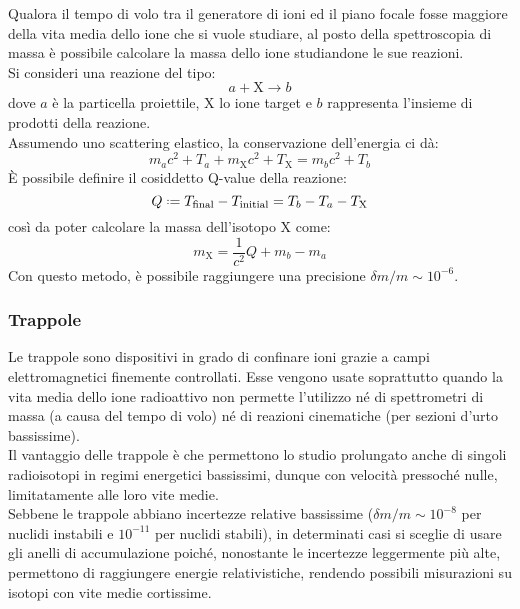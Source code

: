 Qualora il tempo di volo tra il generatore di ioni ed il piano focale fosse maggiore della vita media dello ione che si vuole studiare, al posto della spettroscopia di massa è possibile calcolare la massa dello ione studiandone le sue reazioni.\\
Si consideri una reazione del tipo:
\begin{equation}
	a + \text{X} \longrightarrow b
	\label{eq:1.19}
\end{equation}
dove $ a $ è la particella proiettile, $ \text{X} $ lo ione target e $ b $ rappresenta l'insieme di prodotti della reazione.\\
Assumendo uno scattering elastico, la conservazione dell'energia ci dà:
\begin{equation}
	m_a c^2 + T_a + m_{\text{X}} c^2 + T_{\text{X}} = m_b c^2 + T_b
	\label{eq:1.20}
\end{equation}
È possibile definire il cosiddetto Q-value della reazione:
\begin{equation}
	Q \defeq T_{\text{final}} - T_{\text{initial}} = T_b - T_a - T_{\text{X}}
	\label{eq:1.21}
\end{equation}
così da poter calcolare la massa dell'isotopo $ \text{X} $ come:
\begin{equation}
	m_{\text{X}} = \frac{1}{c^2} Q + m_b - m_a
	\label{eq:1.22}
\end{equation}
Con questo metodo, è possibile raggiungere una precisione $ \delta m / m \sim 10^{-6} $.

\subsubsection{Trappole}

Le trappole sono dispositivi in grado di confinare ioni grazie a campi elettromagnetici finemente controllati. Esse vengono usate soprattutto quando la vita media dello ione radioattivo non permette l'utilizzo né di spettrometri di massa (a causa del tempo di volo) né di reazioni cinematiche (per sezioni d'urto bassissime).\\
Il vantaggio delle trappole è che permettono lo studio prolungato anche di singoli radioisotopi in regimi energetici bassissimi, dunque con velocità pressoché nulle, limitatamente alle loro vite medie.\\
Sebbene le trappole abbiano incertezze relative bassissime ($ \delta m / m \sim 10^{-8} $ per nuclidi instabili e $ 10^{-11} $ per nuclidi stabili), in determinati casi si sceglie di usare gli anelli di accumulazione poiché, nonostante le incertezze leggermente più alte, permettono di raggiungere energie relativistiche, rendendo possibili misurazioni su isotopi con vite medie cortissime.

